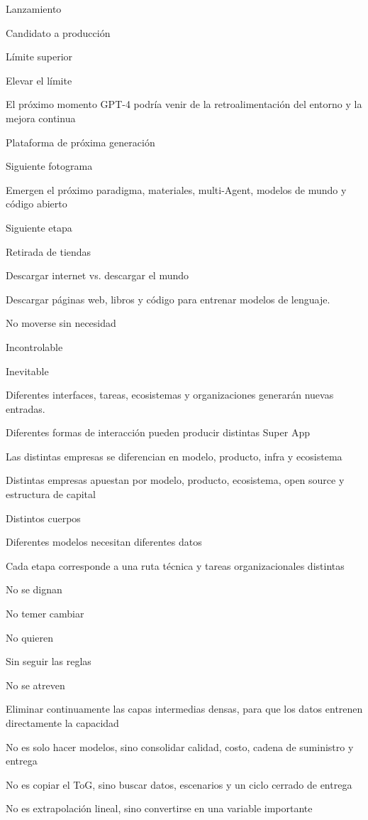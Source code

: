 \documentclass{article}
\begin{document}
Lanzamiento

Candidato a producción

Límite superior

Elevar el límite

El próximo momento GPT-4 podría venir de la retroalimentación del entorno y la mejora continua

Plataforma de próxima generación

Siguiente fotograma

Emergen el próximo paradigma, materiales, multi-Agent, modelos de mundo y código abierto

Siguiente etapa

Retirada de tiendas

Descargar internet vs. descargar el mundo

Descargar páginas web, libros y código para entrenar modelos de lenguaje.

No moverse sin necesidad

Incontrolable

Inevitable

Diferentes interfaces, tareas, ecosistemas y organizaciones generarán nuevas entradas.

Diferentes formas de interacción pueden producir distintas Super App

Las distintas empresas se diferencian en modelo, producto, infra y ecosistema

Distintas empresas apuestan por modelo, producto, ecosistema, open source y estructura de capital

Distintos cuerpos

Diferentes modelos necesitan diferentes datos

Cada etapa corresponde a una ruta técnica y tareas organizacionales distintas

No se dignan

No temer cambiar

No quieren

Sin seguir las reglas

No se atreven

Eliminar continuamente las capas intermedias densas, para que los datos entrenen directamente la capacidad

No es solo hacer modelos, sino consolidar calidad, costo, cadena de suministro y entrega

No es copiar el ToG, sino buscar datos, escenarios y un ciclo cerrado de entrega

No es extrapolación lineal, sino convertirse en una variable importante
\end{document}
